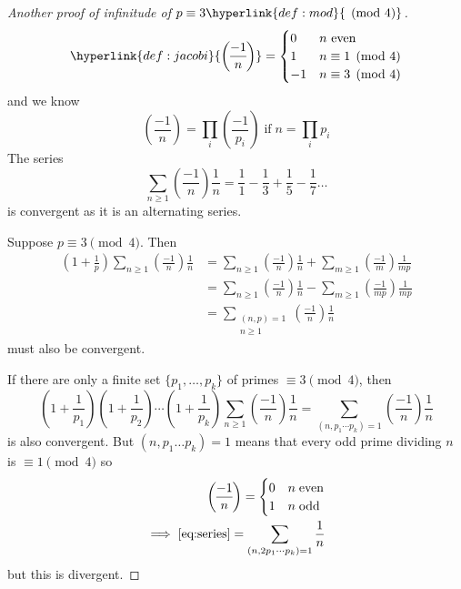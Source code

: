 \documentclass{article}
\newcommand{\legendre}[2]{\genfrac{(}{)}{}{}{#1}{#2}}
\begin{document}
\begin{proof}[Another proof of infinitude of $p \equiv 3 \hyperlink{def:mod}{\pmod{4}}$]
    \begin{equation*}
        \hyperlink{def:jacobi}{\legendre{-1}{n}} =
        \begin{cases}
            0 & n \ \text{even} \\
            1 & n \equiv 1 \pmod{4} \\
            -1 & n \equiv 3 \pmod{4}
        \end{cases}
    \end{equation*}
    and we know
    \begin{equation*}
        \legendre{-1}{n} = \prod_i \legendre{-1}{p_i} \; \text{if} \; n = \prod_i p_i
    \end{equation*}
    The series
    \begin{equation*}
        \sum_{n \geq 1} \legendre{-1}{n} \frac{1}{n} = \frac{1}{1} - \frac{1}{3} + \frac{1}{5} - \frac{1}{7} \dots
    \end{equation*}
    is convergent as it is an alternating series.

    Suppose $p \equiv 3 \pmod{4}$. Then
    \begin{align*}
        \left(1 + \frac{1}{p}\right) \sum_{n \geq 1} \legendre{-1}{n} \frac{1}{n}
        &= \sum_{n \geq 1} \legendre{-1}{n} \frac{1}{n} + \sum_{m \geq 1} \legendre{-1}{m} \frac{1}{mp} \\
        &= \sum_{n \geq 1} \legendre{-1}{n} \frac{1}{n} - \sum_{m \geq 1} \legendre{-1}{mp} \frac{1}{mp} \\
        &= \sum_{\substack{(n, p) = 1 \\ n \geq 1}} \legendre{-1}{n} \frac{1}{n}
    \end{align*}
    must also be convergent.

    If there are only a finite set $\{p_1, \dotsc, p_k\}$ of primes $\equiv 3 \pmod{4}$, then
    \begin{equation}\label{eq:series}
        \left(1 + \frac{1}{p_1}\right)
        \left(1 + \frac{1}{p_2}\right) \dotsm
        \left(1 + \frac{1}{p_k}\right)
        \sum_{n \geq 1} \legendre{-1}{n} \frac{1}{n}
        = \sum_{(n, p_1 \dotsm p_k)=1} \legendre{-1}{n} \frac{1}{n} \tag{$*$}
    \end{equation}
    is also convergent.
    But $(n, p_1 \dots p_k) = 1$ means that every odd prime dividing $n$ is $\equiv 1 \pmod{4}$ so
    \begin{align*}
        \legendre{-1}{n} =
        \begin{cases}
            0 & n \; \text{even} \\
            1 & n \; \text{odd}
        \end{cases} \\
        \implies \text{\eqref{eq:series}} = \sum_{(n, 2p_1 \dotsm p_k) = 1} \frac{1}{n}
    \end{align*}
    but this is divergent.
\end{proof}
\end{document}
